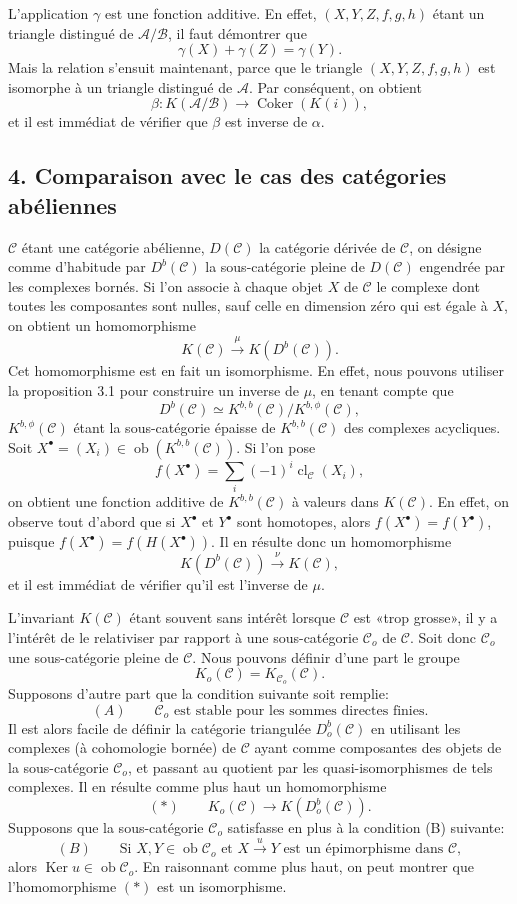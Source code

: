 \documentclass[11pt]{article}
\providecommand{\Ob}{\operatorname{ob}}
\providecommand{\cC}{\mathcal C}
\providecommand{\Ob}{\operatorname{ob}}
\providecommand{\cC}{\mathcal C}
\providecommand{\cA}{\mathcal A}
\providecommand{\cB}{\mathcal B}
\providecommand{\Ob}{\operatorname{Ob}}
\providecommand{\Ob}{\operatorname{ob}}
\begin{document}
L'application $\gamma$ est une fonction additive. En effet, $(X,Y,Z,f,g,h)$ étant un triangle distingué de $\cA/\cB$, il faut démontrer que
\[
\gamma(X)+\gamma(Z)=\gamma(Y).
\]
Mais la relation s'ensuit maintenant, parce que le triangle $(X,Y,Z,f,g,h)$ est isomorphe à un triangle distingué de $\cA$. Par conséquent, on obtient
\[
\beta:K(\cA/\cB)\longrightarrow \operatorname{Coker}(K(i)),
\]
et il est immédiat de vérifier que $\beta$ est inverse de $\alpha$.

\subsection*{4. Comparaison avec le cas des catégories abéliennes}

$\cC$ étant une catégorie abélienne, $D(\cC)$ la catégorie dérivée de $\cC$, on désigne comme d'habitude par $D^b(\cC)$ la sous-catégorie pleine de $D(\cC)$ engendrée par les complexes bornés. Si l'on associe à chaque objet $X$ de $\cC$ le complexe dont toutes les composantes sont nulles, sauf celle en dimension zéro qui est égale à $X$, on obtient un homomorphisme
\[
K(\cC)\xrightarrow{\mu}K(D^b(\cC)).
\]
Cet homomorphisme est en fait un isomorphisme. En effet, nous pouvons utiliser la proposition 3.1 pour construire un inverse de $\mu$, en tenant compte que
\[
D^b(\cC)\simeq K^{b,b}(\cC)/K^{b,\phi}(\cC),
\]
$K^{b,\phi}(\cC)$ étant la sous-catégorie épaisse de $K^{b,b}(\cC)$ des complexes acycliques. Soit $X^\bullet=(X_i)\in\Ob(K^{b,b}(\cC))$. Si l'on pose
\[
f(X^\bullet)=\sum_i(-1)^i\operatorname{cl}_{\cC}(X_i),
\]
on obtient une fonction additive de $K^{b,b}(\cC)$ à valeurs dans $K(\cC)$. En effet, on observe tout d'abord que si $X^\bullet$ et $Y^\bullet$ sont homotopes, alors $f(X^\bullet)=f(Y^\bullet)$, puisque $f(X^\bullet)=f(H(X^\bullet))$. Il en résulte donc un homomorphisme
\[
K(D^b(\cC))\xrightarrow{\nu}K(\cC),
\]
et il est immédiat de vérifier qu'il est l'inverse de $\mu$.

L'invariant $K(\cC)$ étant souvent sans intérêt lorsque $\cC$ est «trop grosse», il y a l'intérêt de le relativiser par rapport à une sous-catégorie $\cC_o$ de $\cC$. Soit donc $\cC_o$ une sous-catégorie pleine de $\cC$. Nous pouvons définir d'une part le groupe
\[
K_o(\cC)=K_{\cC_o}(\cC).
\]
Supposons d'autre part que la condition suivante soit remplie:
\[
(A)\qquad \cC_o\text{ est stable pour les sommes directes finies.}
\]
Il est alors facile de définir la catégorie triangulée $D_o^b(\cC)$ en utilisant les complexes (à cohomologie bornée) de $\cC$ ayant comme composantes des objets de la sous-catégorie $\cC_o$, et passant au quotient par les quasi-isomorphismes de tels complexes. Il en résulte comme plus haut un homomorphisme
\[
(*)\qquad K_o(\cC)\longrightarrow K(D_o^b(\cC)).
\]
Supposons que la sous-catégorie $\cC_o$ satisfasse en plus à la condition (B) suivante:
\[
(B)\qquad
\text{Si }X,Y\in\Ob\cC_o\text{ et }X\xrightarrow{u}Y
\text{ est un épimorphisme dans }\cC,
\]
alors $\operatorname{Ker}u\in\Ob\cC_o$. En raisonnant comme plus haut, on peut montrer que l'homomorphisme $(*)$ est un isomorphisme.
\end{document}
